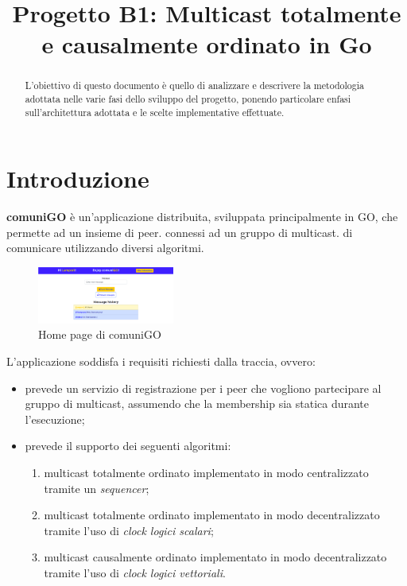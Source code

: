 \documentclass[conference]{IEEEtran}
\begin{document}
\title{Progetto B1: Multicast totalmente e causalmente ordinato in Go}

\author{
}


\maketitle

\begin{abstract}
L'obiettivo di questo documento è quello di analizzare e descrivere la metodologia adottata nelle varie fasi dello sviluppo del progetto, ponendo particolare enfasi sull'architettura adottata e le scelte implementative effettuate. 
\end{abstract}

\section{Introduzione}
\textbf{comuniGO} è un'applicazione distribuita, sviluppata principalmente in GO, che permette ad un insieme di peer. connessi ad un gruppo di multicast. di comunicare utilizzando diversi algoritmi.

\begin{figure}[htbp]
\centerline{\includegraphics[width=0.4\textwidth]{figs/home.png}}
\caption{Home page di comuniGO}
\label{fig:home}
\end{figure}

L'applicazione soddisfa i requisiti richiesti dalla traccia, ovvero:
\begin{itemize}
\item prevede un servizio di registrazione per i peer che vogliono partecipare al gruppo di multicast, assumendo che la membership sia statica durante l'esecuzione;

\item prevede il supporto dei seguenti algoritmi:
\begin{enumerate}
\item multicast totalmente ordinato implementato in modo centralizzato tramite un \textsl{sequencer};

\item multicast totalmente ordinato implementato in modo decentralizzato tramite l'uso di \textsl{clock logici
scalari};

\item multicast causalmente ordinato implementato in modo decentralizzato tramite l'uso di \textsl{clock
logici vettoriali}.
\end{enumerate}
\end{itemize}
\end{document}

